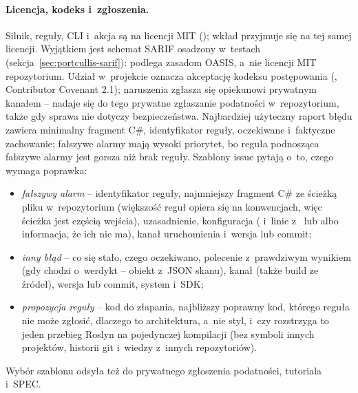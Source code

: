 \paragraph{Licencja, kodeks i~zgłoszenia.} Silnik, reguły, CLI i~akcja są na licencji MIT
(); wkład przyjmuje się na tej samej licencji. Wyjątkiem jest schemat SARIF
osadzony w~testach (sekcja~\ref{sec:portcullis-sarif}): podlega zasadom OASIS, a~nie licencji
MIT repozytorium. Udział w~projekcie oznacza akceptację kodeksu postępowania
(, Contributor Covenant 2.1); naruszenia zgłasza się
opiekunowi prywatnym kanałem -- nadaje się do tego prywatne zgłaszanie podatności
w~repozytorium, także gdy sprawa nie dotyczy bezpieczeństwa. Najbardziej użyteczny raport
błędu zawiera minimalny fragment C\#, identyfikator reguły, oczekiwane i~faktyczne
zachowanie; fałszywe alarmy mają wysoki priorytet, bo reguła podnosząca fałszywe alarmy
jest gorsza niż brak reguły. Szablony issue pytają o~to, czego wymaga poprawka:
\begin{itemize}[leftmargin=*]
  \item \emph{fałszywy alarm} -- identyfikator reguły, najmniejszy fragment C\# ze ścieżką
        pliku w~repozytorium (większość reguł opiera się na konwencjach, więc ścieżka jest
        częścią wejścia), uzasadnienie, konfiguracja ( i~linie
         z~ lub 
        albo informacja, że ich nie ma), kanał uruchomienia i~wersja lub commit;
  \item \emph{inny błąd} -- co się stało, czego oczekiwano, polecenie z~prawdziwym wynikiem
        (gdy chodzi o~werdykt -- obiekt  z~JSON skanu), kanał (także build ze
        źródeł), wersja lub commit, system i~SDK;
  \item \emph{propozycja reguły} -- kod do złapania, najbliższy poprawny kod, którego reguła
        nie może zgłosić, dlaczego to architektura, a~nie styl, i~czy rozstrzyga to jeden
        przebieg Roslyn na pojedynczej kompilacji (bez symboli innych projektów, historii git
        i~wiedzy z~innych repozytoriów).
\end{itemize}
Wybór szablonu odsyła też do prywatnego zgłoszenia podatności, tutoriala i~SPEC.


